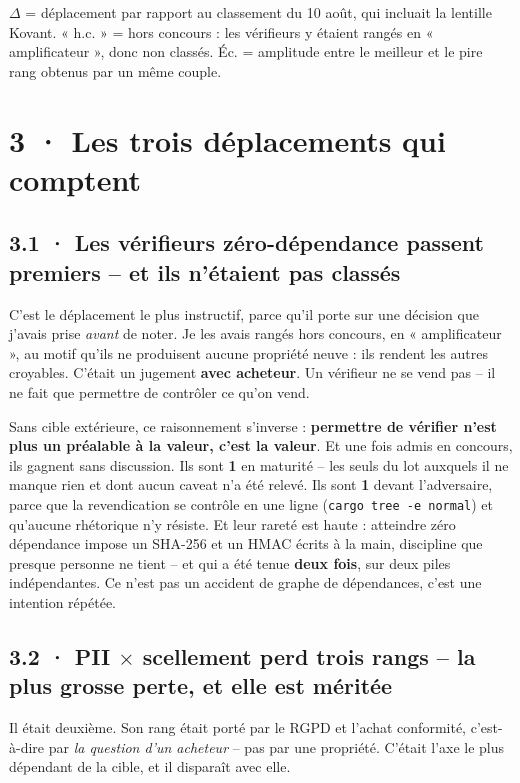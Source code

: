 \documentclass[10pt]{article}
\newcommand{\best}[1]{{\color{green}\textbf{#1}}}
\newcommand{\sz}[1]{{\small\color{grey}\textsf{#1}}}
\newcommand{\code}[1]{\texttt{\small #1}}
\newcommand{\x}{$\times$}
\begin{document}
\sz{$\Delta$ = déplacement par rapport au classement du 10 août, qui incluait la lentille Kovant.
« h.c. » = hors concours : les vérifieurs y étaient rangés en « amplificateur », donc non classés.
Éc. = amplitude entre le meilleur et le pire rang obtenus par un même couple.}

\section{3 · Les trois déplacements qui comptent}

\subsection{3.1 · Les vérifieurs zéro-dépendance passent premiers -- et ils n'étaient pas classés}

C'est le déplacement le plus instructif, parce qu'il porte sur une décision que j'avais prise
\emph{avant} de noter. Je les avais rangés hors concours, en « amplificateur », au motif qu'ils ne
produisent aucune propriété neuve : ils rendent les autres croyables. C'était un jugement
\textbf{avec acheteur}. Un vérifieur ne se vend pas -- il ne fait que permettre de contrôler ce qu'on
vend.

Sans cible extérieure, ce raisonnement s'inverse : \textbf{permettre de vérifier n'est plus un
préalable à la valeur, c'est la valeur}. Et une fois admis en concours, ils gagnent sans discussion.
Ils sont \best{1} en maturité -- les seuls du lot auxquels il ne manque rien et dont aucun caveat n'a
été relevé. Ils sont \best{1} devant l'adversaire, parce que la revendication se contrôle en une ligne
(\code{cargo tree -e normal}) et qu'aucune rhétorique n'y résiste. Et leur rareté est haute : atteindre
zéro dépendance impose un SHA-256 et un HMAC écrits à la main, discipline que presque personne ne tient
-- et qui a été tenue \textbf{deux fois}, sur deux piles indépendantes. Ce n'est pas un accident de
graphe de dépendances, c'est une intention répétée.

\subsection{3.2 · PII \x{} scellement perd trois rangs -- la plus grosse perte, et elle est méritée}

Il était deuxième. Son rang était porté par le RGPD et l'achat conformité, c'est-à-dire par
\emph{la question d'un acheteur} -- pas par une propriété. C'était l'axe le plus dépendant de la cible,
et il disparaît avec elle.
\end{document}
